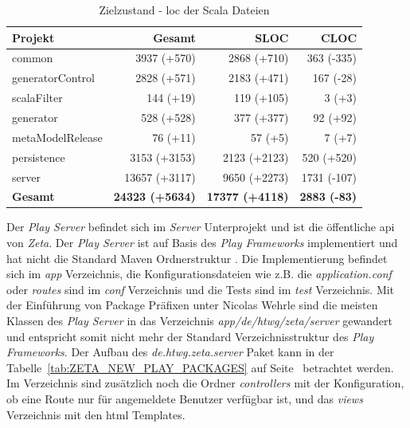 \begin{table}[ht]
    \smallskip
    \centering
    \begin{tabular}{| l | r | r | r |}
    \hline
    \bf Projekt & \bf Gesamt & \bf SLOC & \bf CLOC \\ \hline
    common & 3937 (+570) & 2868 (+710) & 363 (-335) \\ \hline
    generatorControl & 2828 (+571) & 2183 (+471) & 167 (-28) \\ \hline
    scalaFilter & 144 (+19) & 119 (+105) & 3 (+3) \\ \hline
    generator & 528 (+528) & 377 (+377) & 92 (+92) \\ \hline
    metaModelRelease & 76 (+11) & 57 (+5) & 7 (+7) \\ \hline
    persistence & 3153 (+3153) & 2123 (+2123) & 520 (+520) \\ \hline
    server & 13657 (+3117) & 9650 (+2273) & 1731 (-107) \\ \hline
    \bf Gesamt & \bf 24323 (+5634) & \bf 17377 (+4118) & \bf 2883 (-83) \\ \hline
    \end{tabular}
    \caption{Zielzustand - \ac{loc} der Scala Dateien \cite{analys_new_directory}}
    \label{tab:ZETA_METRICS_LOC_NEW}
\end{table}

Der \textit{Play Server} befindet sich im \textit{Server} Unterprojekt und ist die öffentliche \ac{api} von \textit{Zeta}. Der \textit{Play Server} ist auf Basis des \textit{Play Frameworks} implementiert und hat nicht die Standard Maven Ordnerstruktur \cite{play_framework_anatomy}. Die Implementierung befindet sich im \textit{app} Verzeichnis, die Konfigurationsdateien wie z.B. die \textit{application.conf} oder \textit{routes} sind im \textit{conf} Verzeichnis und die Tests sind im \textit{test} Verzeichnis. Mit der Einführung von Package Präfixen unter Nicolas Wehrle sind die meisten Klassen des \textit{Play Server} in das Verzeichnis \textit{app/de/htwg/zeta/server} gewandert und entspricht somit nicht mehr der Standard Verzeichnisstruktur des \textit{Play Frameworks}. Der Aufbau des \textit{de.htwg.zeta.server} Paket kann in der Tabelle~\ref{tab:ZETA_NEW_PLAY_PACKAGES} auf Seite~\pageref{tab:ZETA_NEW_PLAY_PACKAGES} betrachtet werden. Im  Verzeichnis sind zusätzlich noch die Ordner \textit{controllers} mit der Konfiguration, ob eine Route nur für angemeldete Benutzer verfügbar ist, und das \textit{views} Verzeichnis mit den \ac{html} Templates. 

